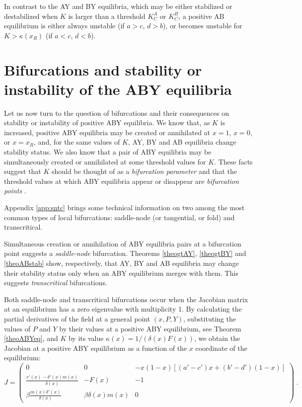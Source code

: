 \documentclass[12pt]{article}
\theoremstyle{definition}
\begin{document}
In contrast to the AY and BY equilibria, which may be either stabilized or destabilized when $K$ is larger than a threshold $K^A_C$ or $K^B_C$, a positive AB equilibrium is either always unstable (if $a>c$, $d>b$), or becomes unstable for $K> \kappa(x_R)$ (if $a<c$, $d<b$).

\section{Bifurcations and stability or instability of the ABY equilibria}  \label{sec:bif}
Let us now turn to the question of bifurcations and their consequences on stability or instability of positive ABY equilibria. We know that, as $K$ is increased, positive ABY equilibria may be created or annihilated at $x=1$, $x=0$, or $x=x_R$, and, for the same values of $K$, AY, BY and AB equilibria change stability status. We also know that a pair of ABY equilibria may be simultaneously created or annihilated at some threshold values for $K$. These facts suggest that $K$ should be thought of as a \emph{bifurcation parameter} and that the threshold values at which ABY equilibria appear or disappear are \emph{bifurcation points} \cite{guckhol, perko}. 

Appendix \ref{app:sntc} brings some technical information on two among the most common types of local bifurcations: saddle-node (or tangential, or fold) and transcritical.

Simultaneous creation or annihilation of ABY equilibria pairs at a bifurcation point suggests a \emph{saddle-node} bifurcation. Theorems \ref{theogtAY}, \ref{theogtBY} and \ref{theoABstab} show, respectively, that AY, BY and AB equilibria may change their stability status only when an ABY equilibrium merges with them. This suggests \emph{transcritical} bifurcations.

Both saddle-node and transcritical bifurcations occur when the Jacobian matrix at an equilibrium has a zero eigenvalue with multiplicity 1. By calculating the partial derivatives of the field at a general point $(x,P,Y)$, substituting the values of $P$ and $Y$ by their values at a positive ABY equilibrium, see Theorem \ref{theoABYeq}, and $K$ by its value $\kappa(x)=1/(\delta(x)F(x))$, we obtain the Jacobian at a positive ABY equilibrium as a function of the $x$ coordinate of the equilibrium:
\begin{equation}  \label{ABYJac}
	J= \begin{pmatrix}
		0&0& -x(1-x) \left[(a'-c')x+(b'-d')(1-x)\right]\\
		\frac{r'(x)-\delta'(x)m(x)}{\delta(x)}&-F(x)&-1\\
		\beta \frac{m(x) \delta'(x)}{\delta(x)}&\beta \delta(x)m(x)&0
	\end{pmatrix}\;.
\end{equation}
\end{document}
